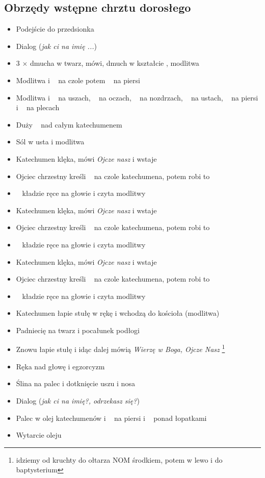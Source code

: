 \subsection{Obrzędy wstępne chrztu dorosłego}
\label{sec:chrzest}
\begin{itemize}
      \item Podejście do przedsionka
      \item Dialog (\textit{jak ci na imię ...})
      \item 3 $\times$ dmucha w twarz, mówi, dmuch w kształcie \krzyz, modlitwa
      \item Modlitwa i \krzyz~ na czole potem \krzyz~ na piersi
      \item Modlitwa i \krzyz\krzyz~ na uszach, \krzyz\krzyz~ na oczach,
            \krzyz\krzyz~ na nozdrzach, \krzyz~ na ustach, \krzyz~ na piersi i
            \krzyz~ na plecach
      \item Duży \krzyz~ nad całym katechumenem
      \item Sól w usta i modlitwa
      \item Katechumen klęka, mówi \textit{Ojcze nasz} i wstaje
      \item Ojciec chrzestny kreśli \krzyz~ na czole katechumena, potem robi to
            \ii
      \item \ii~ kładzie ręce na głowie i czyta modlitwy
      \item Katechumen klęka, mówi \textit{Ojcze nasz} i wstaje
      \item Ojciec chrzestny kreśli \krzyz~ na czole katechumena, potem robi to
            \ii
      \item \ii~ kładzie ręce na głowie i czyta modlitwy
      \item Katechumen klęka, mówi \textit{Ojcze nasz} i wstaje
      \item Ojciec chrzestny kreśli \krzyz~ na czole katechumena, potem robi to
            \ii
      \item \ii~ kładzie ręce na głowie i czyta modlitwy
      \item Katechumen łapie stułę w rękę i wchodzą do kościoła (modlitwa)
      \item Padniecię na twarz i pocałunek podłogi
      \item Znowu łapie stułę i idąc dalej mówią \textit{Wierzę w Boga, Ojcze
                  Nasz} \footnote{idziemy od kruchty do ołtarza NOM środkiem,
                  potem w lewo i do baptysterium}
      \item Ręka nad głowę i egzorcyzm
      \item Ślina na palec i dotknięcie uszu i nosa
      \item Dialog (\textit{jak ci na imię?, odrzekasz się?})
      \item Palec w olej katechumenów i \krzyz~ na piersi i \krzyz~ ponad
            łopatkami
      \item Wytarcie oleju
\end{itemize}

